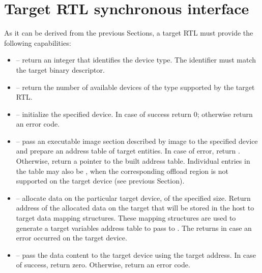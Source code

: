 \section{Target RTL synchronous interface}\label{sc:TargetRTLInterface}

As it can be derived from the previous Sections, a target RTL must provide the following capabilities:

\begin{itemize}
  \item {} – return an integer that identifies the device type. The identifier must match the target binary descriptor.

  \item {} – return the number of available devices of the type supported by the target RTL.

  \item {} – initialize the specified device. In case of success return 0; otherwise return an error code. 

  \item {} – pass an executable image section described by image to the specified device and prepare an address table of target entities. In case of error, return . Otherwise, return a pointer to the built address table. Individual entries in the table may also be , when the corresponding offload region is not supported on the target device (see previous Section).

  \item {} – allocate data on the particular target device, of the specified size. Return address of the allocated data on the target that will be stored in the \libomptarget host to target data mapping structures. These mapping structures are used to generate a target variables address table to pass to . The returns  in case an error occurred on the target device.

  \item {} – pass the data content to the target device using the target address. In case of success, return zero. Otherwise, return an error code.


\end{itemize}
